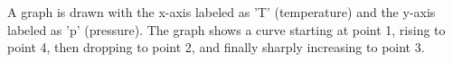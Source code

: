 A graph is drawn with the x-axis labeled as 'T' (temperature) and the y-axis labeled as 'p' (pressure). The graph shows a curve starting at point 1, rising to point 4, then dropping to point 2, and finally sharply increasing to point 3.
